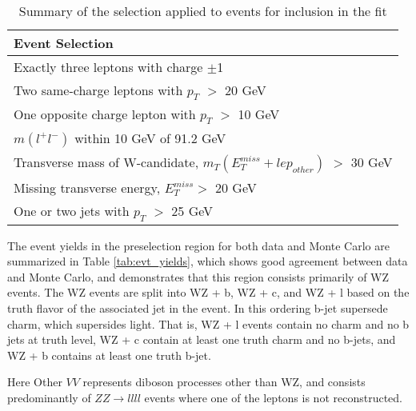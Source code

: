 \begin{table}[H] 
    \centering
    \begin{tabular}{l}
        \hline\hline
        Event Selection\\
        \hline 
        Exactly three leptons with charge $\pm$1 \\
        Two same-charge leptons with $p_T$ $>$ 20 GeV \\
        One opposite charge lepton with $p_T$ $>$ 10 GeV \\
        $m(l^+l^-)$ within 10 GeV of 91.2 GeV \\
        Transverse mass of W-candidate, $m_T(E_T^{miss} + lep_{other})$ $>$ 30 GeV \\
        Missing transverse energy, $E_T^{miss} >$ 20 GeV \\
        One or two jets with $p_T$ $>$ 25 GeV \\
        \hline\hline
    \end{tabular}
    \caption{Summary of the selection applied to events for inclusion in the fit}
    \label{tbl:selection}
\end{table}

The event yields in the preselection region for both data and Monte Carlo are summarized in Table \ref{tab:evt_yields}, which shows good agreement between data and Monte Carlo, and demonstrates that this region consists primarily of WZ events. The WZ events are split into WZ + b, WZ + c, and WZ + l based on the truth flavor of the associated jet in the event. In this ordering b-jet supersede charm, which supersides light. That is, WZ + l events contain no charm and no b jets at truth level, WZ + c contain at least one truth charm and no b-jets, and WZ + b contains at least one truth b-jet. 

\begin{table}[H] 
    \centering
        
    \label{tab:evt_yields}
\end{table}

Here Other $VV$ represents diboson processes other than WZ, and consists predominantly of $ZZ\rightarrow llll$ events where one of the leptons is not reconstructed.

